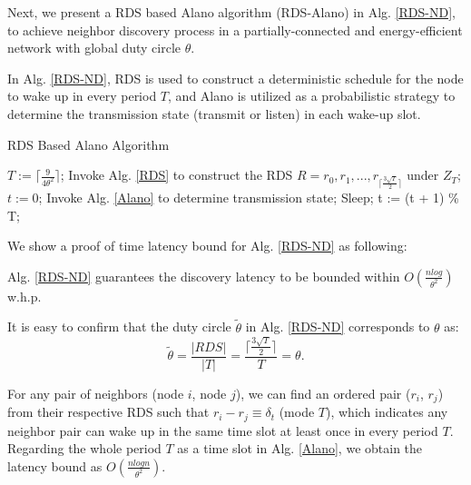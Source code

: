 
Next, we present a RDS based Alano algorithm (RDS-Alano) in Alg. \ref{RDS-ND},
to achieve neighbor discovery process in a partially-connected
and energy-efficient network with global duty circle $\theta$. 

In Alg. \ref{RDS-ND}, RDS is used to construct a deterministic 
schedule for the node to wake up in every period $T$, 
and Alano is utilized as a probabilistic strategy to 
determine the transmission state (transmit or listen)
in each wake-up slot.

\begin{algorithm}
\caption{RDS Based Alano Algorithm}
\label{RDS-ND}
\begin{algorithmic}[1]
\STATE $T := \lceil \frac{9}{4\theta^{2}} \rceil$;
\STATE Invoke Alg. \ref{RDS} to construct the RDS $R = {r_0, r_1, ...,r_{\lceil \frac{3\sqrt{T}}{2}  \rceil}}$ under $Z_T$;
\STATE $t := 0$;
    		\STATE Invoke Alg. \ref{Alano} to determine transmission state;
	\ELSE
    		\STATE Sleep;
	\ENDIF
	\STATE t := (t + 1) \% T;
\ENDWHILE
\end{algorithmic}
\end{algorithm}


We show a proof of time latency bound for Alg. \ref{RDS-ND}  as following:

\begin{theorem}
\label{theoremRDS}
Alg. \ref{RDS-ND} guarantees the discovery latency
to be bounded within $O(\frac{nlog}{\theta^2})$ w.h.p.
\end{theorem}

\begin{IEEEproof}
It is easy to confirm that the duty circle $\widetilde{\theta}$ in Alg. \ref{RDS-ND} corresponds to $\theta$ as:
$$
\widetilde{\theta} = \frac{|RDS|}{|T|} = \frac{\lceil \frac{3\sqrt{T}}{2}  \rceil}{T} = \theta.
$$

For any pair of neighbors (node $i$, node $j$), 
we can find an ordered pair ($r_i$, $r_j$) from their respective RDS
such that $r_i - r_j \equiv \delta_t$ (mode $T$), 
which indicates any neighbor pair can wake up
in the same time slot at least once in every period $T$. 
Regarding the whole period $T$ as a time
slot in Alg. \ref{Alano}, we obtain the latency bound as $O(\frac{nlogn}{\theta^2})$.


\end{IEEEproof}


